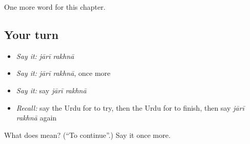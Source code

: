 \begin{grammarlens}[title={What you've built}]
One more word for this chapter.
\end{grammarlens}

\subsection*{Your turn}
\begin{itemize}
\raggedright
  \item \emph{Say it:} \emph{jārī rakhnā}
  \item \emph{Say it:} \emph{jārī rakhnā}, once more
  \item \emph{Say it:} say \emph{jārī rakhnā}
  \item \emph{Recall:} say the Urdu for to try, then the Urdu for to finish, then say \emph{jārī rakhnā} again
\end{itemize}

\begin{tcolorbox}[breakable,colback=teal!4,colframe=teal!35!black,title={Before you move on}]
What does   mean? (\textquotedblleft{}To continue\textquotedblright{}.) Say it once more.
\end{tcolorbox}
